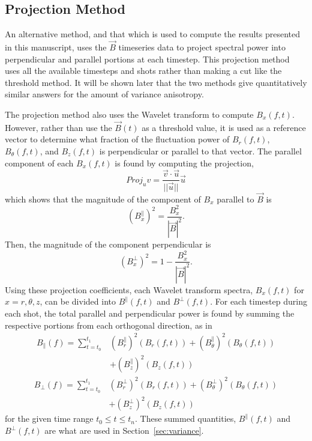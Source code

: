 \documentclass[aip,prl,amsmath,amssymb,reprint,superscriptaddress]{revtex4-1} %
\begin{document}
\subsection{Projection Method}

An alternative method, and that which is used to compute the results presented in this manuscript, uses the $\vec{B}$ timeseries data to project spectral power into perpendicular and parallel portions at each timestep. This projection method uses all the available timesteps and shots rather than making a cut like the threshold method. It will be shown later that the two methods give quantitatively similar answers for the amount of variance anisotropy.

The projection method also uses the Wavelet transform to compute $B_{x}(f,t)$. However, rather than use the $\vec{B}(t)$ as a threshold value, it is used as a reference vector to determine what fraction of the fluctuation power of $B_{r}(f,t)$, $B_{\theta}(f,t)$, and $B_{z}(f,t)$ is perpendicular or parallel to that vector. The parallel component of each $B_{x}(f,t)$ is found by computing the projection,
\begin{equation}
Proj_{u}v = \frac{\vec{v} \cdot \vec{u}}{||\vec{u}||}\vec{u}
\label{eq:projection}
\end{equation}
which shows that the magnitude of the component of $B_{x}$ parallel to $\vec{B}$ is
\begin{equation}
(B_{x}^{\parallel})^{2} = \frac{B^{2}_{x}}{|\vec{B}|^{2}}.
\label{eq:para_mag}
\end{equation}
Then, the magnitude of the component perpendicular is
\begin{equation}
(B_{x}^{\perp})^2 = 1 - \frac{B^{2}_{x}}{|\vec{B}|^{2}}.
\label{eq:perp_mag}
\end{equation}
Using these projection coefficients, each Wavelet transform spectra, $B_{x}(f,t)$ for $x = r,\theta,z$, can be divided into $B^{\parallel}(f,t)$ and $B^{\perp}(f,t)$. For each timestep during each shot, the total parallel and perpendicular power is found by summing the respective portions from each orthogonal direction, as in
\begin{equation}
\begin{split}
B_{\parallel}(f) = \sum_{t=t_{0}}^{t_{1}} &(B_{r}^{\parallel})^{2}(B_{r}(f,t))+(B_{\theta}^{\parallel})^{2}(B_{\theta}(f,t))\\
																					&+(B_{z}^{\parallel})^{2}(B_{z}(f,t))
\label{eq:Bparallel}
\end{split}
\end{equation}
\begin{equation}
\begin{split}
B_{\perp}(f) = \sum_{t=t_{0}}^{t_{1}} &(B_{r}^{\perp})^{2}(B_{r}(f,t))+(B_{\theta}^{\perp})^{2}(B_{\theta}(f,t))\\
																					&+(B_{z}^{\perp})^{2}(B_{z}(f,t))
\label{eq:Bperp}
\end{split}
\end{equation}
for the given time range $t_{0}\leq t \leq t_{n}$. These summed quantities, $B^{\parallel}(f,t)$ and $B^{\perp}(f,t)$ are what are used in Section~\ref{sec:variance}.
\end{document}
